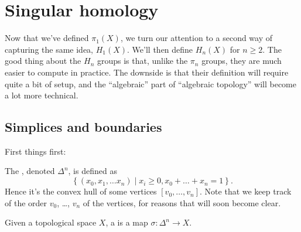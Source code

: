 \chapter{Singular homology}
Now that we've defined $\pi_1(X)$,
we turn our attention to a second way of capturing the same idea, $H_1(X)$.
We'll then define $H_n(X)$ for $n \ge 2$.
The good thing about the $H_n$ groups is that, unlike the $\pi_n$ groups,
they are much easier to compute in practice.
The downside is that their definition will require quite a bit of setup,
and the ``algebraic'' part of ``algebraic topology'' will become a lot more technical.

\section{Simplices and boundaries}
First things first:
\begin{definition}
	The , denoted $\Delta^n$, is defined as
	\[ \left\{ (x_0 , x_1, \dots x_n) \mid x_i \ge 0, x_0+\dots+x_n=1 \right\}. \]
	Hence it's the convex hull of some vertices $[v_0, \dots, v_n]$.
	Note that we keep track of the order $v_0$, \dots, $v_n$ of the vertices,
	for reasons that will soon become clear.

	Given a topological space $X$, a  is a map $\sigma : \Delta^n \to X$.
\end{definition}
